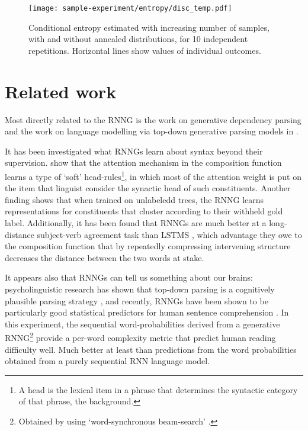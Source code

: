     \begin{figure}[ht]
      \center
    	\texttt{[image: sample-experiment/entropy/disc\_temp.pdf]}
    \caption{Conditional entropy estimated with increasing number of samples, with and without annealed distributions, for 10 independent repetitions. Horizontal lines show values of individual outcomes.}
    \label{fig:samples-entropy}
    \end{figure}

\section{Related work}

    Most directly related to the RNNG is the work on generative dependency parsing \citep{titov2007generative,buys2015bayesian,buys2015generative,buys2018exact} and the work on language modelling via top-down generative parsing models in \citet{roark2001probabilistic}.

    It has been investigated what RNNGs learn about syntax beyond their supervision. \citet{kuncoro2017syntax} show that the attention mechanism in the composition function learns a type of `soft' head-rules\footnote{A head is the lexical item in a phrase that determines the syntactic category of that phrase, \cf the background.}, in which most of the attention weight is put on the item that linguist consider the synactic head of such constituents. Another finding shows that when trained on unlabeledd trees, the RNNG learns representations for constituents that cluster according to their withheld gold label. Additionally, it has been found that RNNGs are much better at a long-distance subject-verb agreement task than LSTMS \citep{linzen2016syntax,kuncoro2018learn}, which advantage they owe to the composition function that by repeatedly compressing intervening structure decreases the distance between the two words at stake.

    It appears also that RNNGs can tell us something about our brains: psycholinguistic research has shown that top-down parsing is a cognitively plausible parsing strategy \citep{brennan2016abstract}, and recently, RNNGs have been shown to be particularly good statistical predictors for human sentence comprehension \citep{hale2018beam}. In this experiment, the sequential word-probabilities derived from a generative RNNG\footnote{Obtained by using `word-synchronous beam-search' \citep{stern2017beam}.} provide a per-word complexity metric that predict human reading difficulty well. Much better at least than predictions from the word probabilities obtained from a purely sequential RNN language model.
